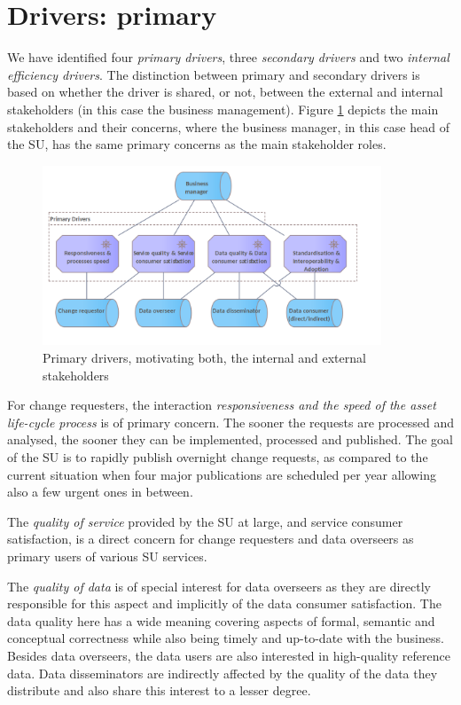 	\section{Drivers: primary}
	
	We have identified four \textit{primary drivers}, three \textit{secondary drivers} and two \textit{internal efficiency drivers}. The distinction between primary and secondary drivers is based on whether the driver is shared, or not, between the external and internal stakeholders (in this case the business management).
	Figure \ref{fig:primary-drivers} depicts the main stakeholders and their concerns, where the business manager, in this case head of the SU, has the same primary concerns as the main stakeholder roles.
	
	\begin{figure}[h]
		\centering
		\includegraphics[width=0.9\textwidth]{images/motivation/Primary drivers.png}
		\caption{Primary drivers, motivating both, the internal and external stakeholders}
		\label{fig:primary-drivers}
	\end{figure}
	
	For change requesters, the interaction \textit{responsiveness and the speed of the asset life-cycle process} is of primary concern. The sooner the requests are processed and analysed, the sooner they can be implemented, processed and published. The goal of the SU is to rapidly publish overnight change requests, as compared to the current situation when four major publications are scheduled per year allowing also a few urgent ones in between.
	
	The \textit{quality of service} provided by the SU at large, and service consumer satisfaction, is a direct concern for change requesters and data overseers as primary users of various SU services. 
	
	The \textit{quality of data} is of special interest for data overseers as they are directly responsible for this aspect and implicitly of the data consumer satisfaction. The data quality here has a wide meaning covering aspects of formal, semantic and conceptual correctness while also being timely and up-to-date with the business. Besides data overseers, the data users are also interested in high-quality reference data. Data disseminators are indirectly affected by the quality of the data they distribute and also share this interest to a lesser degree. 
	
